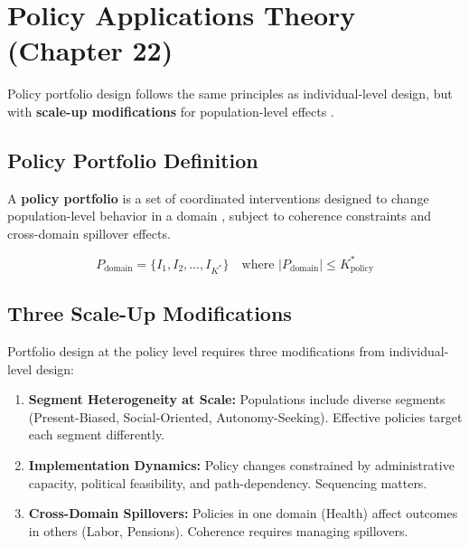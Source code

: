 \section{Policy Applications Theory (Chapter 22)}
\label{sec:mp-policy-applications}

Policy portfolio design follows the same principles as individual-level design, but with
\textbf{scale-up modifications} for population-level effects \citep{sunstein2014nudge, benartzi2017should, thaler2008}.

\subsection{Policy Portfolio Definition}

A \textbf{policy portfolio} is a set of coordinated interventions designed to change
population-level behavior in a domain \citep{halpern2015inside, service2014think}, subject to coherence constraints and cross-domain
spillover effects.

\begin{equation}
\boxed{
P_{\text{domain}} = \{I_1, I_2, \ldots, I_{K^*}\} \quad \text{where } |P_{\text{domain}}| \leq K^*_{\text{policy}}
}
\end{equation}

\subsection{Three Scale-Up Modifications}

Portfolio design at the policy level requires three modifications from individual-level design:

\begin{enumerate}[nosep]
\item \textbf{Segment Heterogeneity at Scale:} Populations include diverse segments (Present-Biased, Social-Oriented, Autonomy-Seeking). Effective policies target each segment differently.

\item \textbf{Implementation Dynamics:} Policy changes constrained by administrative capacity, political feasibility, and path-dependency. Sequencing matters.

\item \textbf{Cross-Domain Spillovers:} Policies in one domain (Health) affect outcomes in others (Labor, Pensions). Coherence requires managing spillovers.
\end{enumerate}

